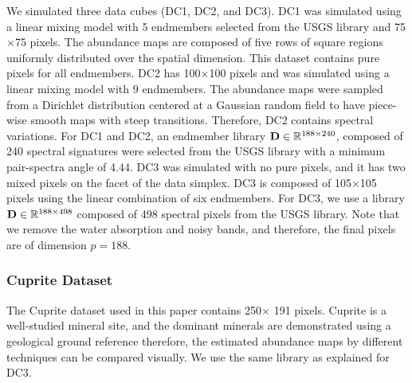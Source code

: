 We simulated three data cubes (DC1, DC2, and DC3). DC1 was simulated using a linear mixing model with 5 endmembers selected from the USGS library and 75$\times$75 pixels. The abundance maps are composed of five rows of square regions uniformly distributed over the spatial dimension. This dataset contains pure pixels for all endmembers. DC2 has 100$\times$100 pixels and was simulated using a linear mixing model with 9 endmembers. The abundance maps were sampled
from a Dirichlet distribution centered at a Gaussian
random field to have piece-wise smooth maps with steep transitions. Therefore, DC2 contains spectral variations. For DC1 and DC2, an endmember library $\mathbf D \in \mathbb{R}^{188\times 240}$, composed of 240 spectral signatures were selected from the USGS library with a minimum pair-spectra angle of 4.44\textdegree. DC3 was simulated with no pure pixels, and it has two mixed pixels on the facet of the data simplex. DC3 is composed of  105$\times$105 pixels using the linear combination of six endmembers. For DC3, we use a library $\mathbf D \in \mathbb{R}^{188\times 498}$ composed of 498 spectral pixels from the USGS library. Note that we remove the water absorption and noisy bands, and therefore, the final pixels are of dimension $p=188$.

\subsubsection{Cuprite Dataset}
The Cuprite dataset used in this paper contains 250$\times$ 191 pixels. Cuprite is a well-studied mineral site, and the dominant minerals are demonstrated using a geological ground reference therefore, the estimated abundance maps by different techniques can be compared visually.
We use the same library as explained for DC3. 


\begin{table}[h]
    \centering
    \caption{Specifications of the synthetic datasets used in the experiments.}
    \label{tab:data_description}
\end{table}


